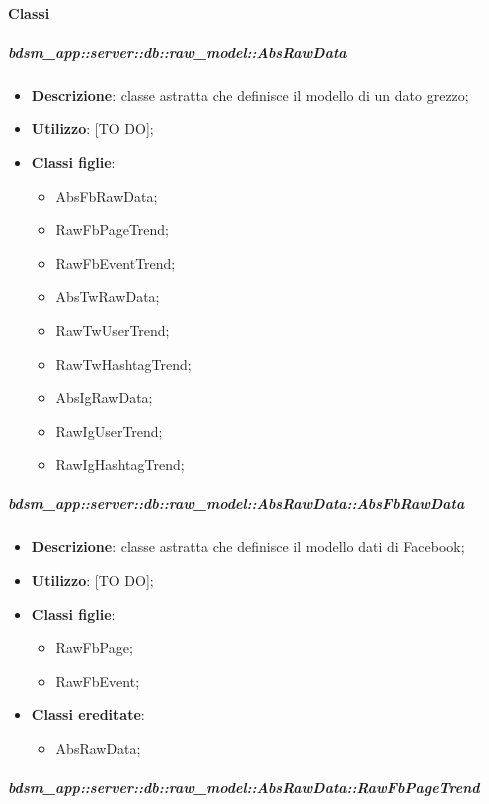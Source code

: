   		\paragraph{Classi} %
			\subparagraph{bdsm\_app::server::db::raw\_model::AbsRawData} %
			\label{subp:bdsm_app_server_raw_model_AbsRawData}
				\begin{itemize}
					\item \textbf{Descrizione}: classe astratta che definisce il modello di un dato grezzo;
					\item \textbf{Utilizzo}: [TO DO];
					\item \textbf{Classi figlie}:
					\begin{itemize}
						\item AbsFbRawData;
						\item RawFbPageTrend;
						\item RawFbEventTrend;
						\item AbsTwRawData;
						\item RawTwUserTrend;
						\item RawTwHashtagTrend;	
						\item AbsIgRawData;
						\item RawIgUserTrend;
						\item RawIgHashtagTrend;				
					\end{itemize}
				\end{itemize}
			\subparagraph{bdsm\_app::server::db::raw\_model::AbsRawData::AbsFbRawData} %
			\label{subp:bdsm_app_server_raw_model_AbsRawData_AbsFbRawData}
				\begin{itemize}
					\item \textbf{Descrizione}: classe astratta che definisce il modello dati di Facebook;
					\item \textbf{Utilizzo}: [TO DO];
					\item \textbf{Classi figlie}:
					\begin{itemize}
						\item RawFbPage;
						\item RawFbEvent;		
					\end{itemize}
					\item \textbf{Classi ereditate}:
					\begin{itemize}
						\item AbsRawData;
					\end{itemize}
				\end{itemize}
			\subparagraph{bdsm\_app::server::db::raw\_model::AbsRawData::RawFbPageTrend} %
